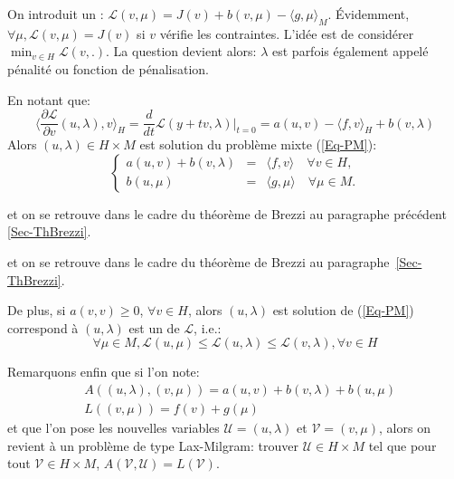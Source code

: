 \medskip



On introduit un :
$\mathscr{L}(v,\mu) = J(v)+b(v,\mu) - \langle g,\mu\rangle_M$.
Évidemment, $\forall\mu, \mathscr{L}(v,\mu)=J(v)$ si $v$ vérifie les contraintes.
L'idée est de considérer $\min_{v\in H} \mathscr{L}(v,.)$.
La question devient alors: 
$\lambda$ est parfois également appelé pénalité ou fonction de pénalisation.


\medskip



En notant que:
\begin{equation}\langle\frac{\partial\mathscr{L}}{\partial v}(u,\lambda),v\rangle_H
=\frac d{dt}\mathscr{L}(y+tv,\lambda)|_{t=0}
=a(u,v)-\langle f,v\rangle_H+b(v,\lambda)
\end{equation}
Alors $(u,\lambda) \in H\times M$ est solution du problème mixte (\ref{Eq-PM}):
 \begin{equation}\left\{
\begin{array}{rcl}
 a(u,v) + b(v, \lambda) &=& \langle f,v\rangle \quad \forall v\in H,\\
b(u,\mu) &=& \langle g,\mu\rangle \quad \forall \mu \in M.
\end{array}\right.
\end{equation}

et on se retrouve dans le cadre du théorème de Brezzi au paragraphe précédent \ref{Sec-ThBrezzi}.

\medskip

et on se retrouve dans le cadre du théorème de Brezzi au paragraphe~\ref{Sec-ThBrezzi}.


De plus, si $a(v,v)\ge 0$, $\forall v\in H$, alors $(u,\lambda)$ est
solution de (\ref{Eq-PM}) correspond à $(u,\lambda)$ est un 
de $\mathscr{L}$, i.e.:
\begin{equation}
\forall\mu\in M, \mathscr{L}(u,\mu) \le \mathscr{L}(u,\lambda) \le
\mathscr{L}(v,\lambda), \forall v\in H
\end{equation}


\medskip



Remarquons enfin que si l'on note:
\begin{align}&A((u,\lambda),(v,\mu))=a(u,v)+b(v,\lambda)+b(u,\mu)\\
&L((v,\mu))=f(v)+g(\mu)\end{align}
et que l'on pose les nouvelles variables $\mathscr{U}=(u,\lambda)$ et $\mathscr{V}=(v,\mu)$,
alors on revient à un problème de type Lax-Milgram: trouver $\mathscr{U}\in H\times M$
tel que pour tout $\mathscr{V}\in H\times M$, $A(\mathscr{V},\mathscr{U})=L(\mathscr{V})$.

